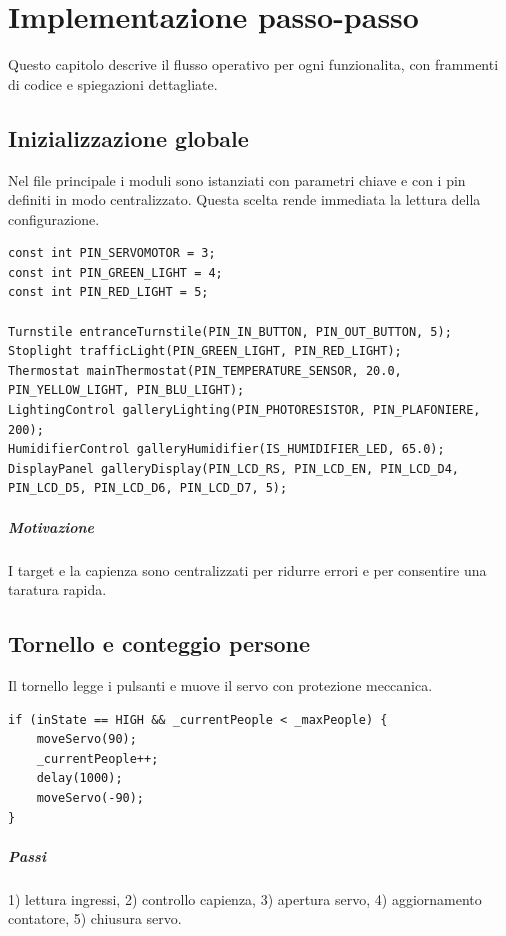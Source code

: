 \chapter{Implementazione passo-passo}

Questo capitolo descrive il flusso operativo per ogni funzionalita, con frammenti di codice e spiegazioni dettagliate.

\section{Inizializzazione globale}
Nel file principale i moduli sono istanziati con parametri chiave e con i pin definiti in modo centralizzato. Questa scelta rende immediata la lettura della configurazione.

\begin{lstlisting}[style=cppstyle]
const int PIN_SERVOMOTOR = 3;
const int PIN_GREEN_LIGHT = 4;
const int PIN_RED_LIGHT = 5;

Turnstile entranceTurnstile(PIN_IN_BUTTON, PIN_OUT_BUTTON, 5);
Stoplight trafficLight(PIN_GREEN_LIGHT, PIN_RED_LIGHT);
Thermostat mainThermostat(PIN_TEMPERATURE_SENSOR, 20.0, PIN_YELLOW_LIGHT, PIN_BLU_LIGHT);
LightingControl galleryLighting(PIN_PHOTORESISTOR, PIN_PLAFONIERE, 200);
HumidifierControl galleryHumidifier(IS_HUMIDIFIER_LED, 65.0);
DisplayPanel galleryDisplay(PIN_LCD_RS, PIN_LCD_EN, PIN_LCD_D4, PIN_LCD_D5, PIN_LCD_D6, PIN_LCD_D7, 5);
\end{lstlisting}

\paragraph{Motivazione} I target e la capienza sono centralizzati per ridurre errori e per consentire una taratura rapida.

\section{Tornello e conteggio persone}
Il tornello legge i pulsanti e muove il servo con protezione meccanica.

\begin{lstlisting}[style=cppstyle]
if (inState == HIGH && _currentPeople < _maxPeople) {
    moveServo(90);
    _currentPeople++;
    delay(1000);
    moveServo(-90);
}
\end{lstlisting}

\paragraph{Passi} 1) lettura ingressi, 2) controllo capienza, 3) apertura servo, 4) aggiornamento contatore, 5) chiusura servo.

